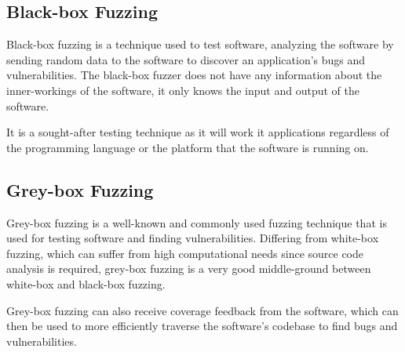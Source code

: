 \documentclass[a4paper,12pt]{article}
\begin{document}
\subsection{Black-box Fuzzing}
Black-box fuzzing is a technique used to test software, analyzing the software by sending random data to the software to discover an application's bugs and vulnerabilities. The black-box fuzzer does not have any information about the inner-workings of the software, it only knows the input and output of the software.


It is a sought-after testing technique as it will work it applications regardless of the programming language or the platform that the software is running on.\cite{ALSAEDI202210068}

\subsection{Grey-box Fuzzing}
Grey-box fuzzing is a well-known and commonly used fuzzing technique that is used for testing software and finding vulnerabilities. Differing from white-box fuzzing, which can suffer from high computational needs since source code analysis is required, grey-box fuzzing is a very good middle-ground between white-box and black-box fuzzing.\cite{8839290} 

Grey-box fuzzing can also receive coverage feedback from the software, which can then be used to more efficiently traverse the software's codebase to find bugs and vulnerabilities.\cite{Blackwell2024-ao}

\newpage

\printbibliography
\end{document}
